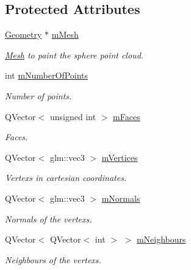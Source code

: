 \subsection*{Protected Attributes}
\begin{DoxyCompactItemize}
\item 
\hyperlink{class_geometry}{Geometry} $\ast$ \hyperlink{class_sphere_point_cloud_a722ae327d20905a422c279bc0bc60258}{m\+Mesh}
\begin{DoxyCompactList}\small\item\em \hyperlink{class_mesh}{Mesh} to paint the sphere point cloud. \end{DoxyCompactList}\item 
int \hyperlink{class_sphere_point_cloud_a0579096387a36228a7167de55d131292}{m\+Number\+Of\+Points}
\begin{DoxyCompactList}\small\item\em Number of points. \end{DoxyCompactList}\item 
Q\+Vector$<$ unsigned int $>$ \hyperlink{class_sphere_point_cloud_a1493117ae52c168b3ca2dc0a395faf65}{m\+Faces}
\begin{DoxyCompactList}\small\item\em Faces. \end{DoxyCompactList}\item 
Q\+Vector$<$ glm\+::vec3 $>$ \hyperlink{class_sphere_point_cloud_a03bccf235a21adebdfcd6a8e4c407c72}{m\+Vertices}
\begin{DoxyCompactList}\small\item\em Vertexs in cartesian coordinates. \end{DoxyCompactList}\item 
Q\+Vector$<$ glm\+::vec3 $>$ \hyperlink{class_sphere_point_cloud_a01a10f53b2432af26235a1acc98391eb}{m\+Normals}
\begin{DoxyCompactList}\small\item\em Normals of the vertexs. \end{DoxyCompactList}\item 
Q\+Vector$<$ Q\+Vector$<$ int $>$ $>$ \hyperlink{class_sphere_point_cloud_a11b1736edb303b804dc0882edc8718a8}{m\+Neighbours}
\begin{DoxyCompactList}\small\item\em Neighbours of the vertexs. \end{DoxyCompactList}\end{DoxyCompactItemize}
